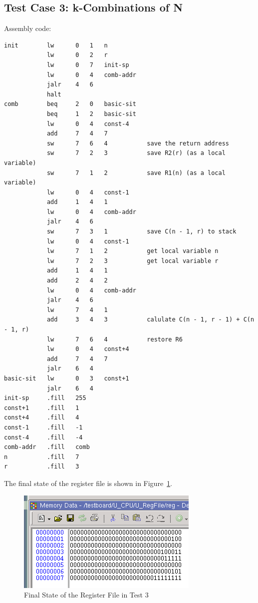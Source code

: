 \documentclass[a4paper]{article}
\begin{document}
\subsection{Test Case 3: k-Combinations of N}

Assembly code:

\begin{verbatim}
init        lw      0   1   n
            lw      0   2   r
            lw      0   7   init-sp
            lw      0   4   comb-addr
            jalr    4   6
            halt
comb        beq     2   0   basic-sit
            beq     1   2   basic-sit
            lw      0   4   const-4
            add     7   4   7
            sw      7   6   4           save the return address
            sw      7   2   3           save R2(r) (as a local variable)
            sw      7   1   2           save R1(n) (as a local variable)
            lw      0   4   const-1
            add     1   4   1
            lw      0   4   comb-addr
            jalr    4   6
            sw      7   3   1           save C(n - 1, r) to stack
            lw      0   4   const-1
            lw      7   1   2           get local variable n
            lw      7   2   3           get local variable r
            add     1   4   1
            add     2   4   2
            lw      0   4   comb-addr
            jalr    4   6
            lw      7   4   1
            add     3   4   3           calulate C(n - 1, r - 1) + C(n - 1, r)
            lw      7   6   4           restore R6
            lw      0   4   const+4
            add     7   4   7
            jalr    6   4
basic-sit   lw      0   3   const+1
            jalr    6   4
init-sp     .fill   255
const+1     .fill   1
const+4     .fill   4
const-1     .fill   -1
const-4     .fill   -4
comb-addr   .fill   comb
n           .fill   7
r           .fill   3
\end{verbatim}

The final state of the register file is shown in Figure~\ref{fig:reg_test3}.
\begin{figure}[ht!]
    \center
    \includegraphics[scale=0.6]{reg_test3}
    \caption{Final State of the Register File in Test 3}\label{fig:reg_test3}
\end{figure}
\end{document}
